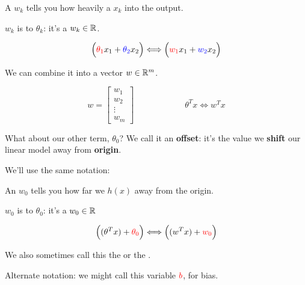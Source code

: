         \begin{notation}
            A  $w_k$ tells you how heavily a  $x_k$  into the output.
            
            $w_k$ is  to $\theta_k$: it's a  $w_k \in \mathbb R$.
            
            \begin{equation*}
                \Big( 
                    \textcolor{red}{\theta_1}x_1 + \textcolor{blue}{\theta_2}x_2 
                \Big)
                \Longleftrightarrow 
                \Big(
                    \textcolor{red}{w_1}x_1+\textcolor{blue}{w_2}x_2
                \Big)
            \end{equation*}
            
            We can combine it into a vector $w \in \mathbb R^m$.
            
            \begin{equation*}
                w = 
                    \begin{bmatrix}
                      w_1 \\ w_2 \\ \vdots \\ w_m
                    \end{bmatrix}
                \qquad \qquad \qquad
                \theta^Tx \Longleftrightarrow w^Tx
            \end{equation*}
        \end{notation}
        
        
        
        What about our other term, $\theta_0$? We call it an \textbf{offset}: it's the value we \textbf{shift} our linear model away from \textbf{origin}.
        
        We'll use the same notation:\\
        
        \begin{notation}
            An  $w_0$ tells you how far we  $h(x)$ away from the origin. 
            
            $w_0$ is  to $\theta_0$: it's a  $w_0 \in \mathbb R$
            
            \begin{equation*}
                \Big(
                    (\theta^Tx) + \textcolor{red}{\theta_0} 
                \Big)
                \Longleftrightarrow 
                \Big(
                    (w^Tx) + \textcolor{red}{w_0}
                \Big)
            \end{equation*}
            
            We also sometimes call this the  or the .
            
            Alternate notation: we might call this variable $\textcolor{red}{b}$, for bias.
        \end{notation}
        
